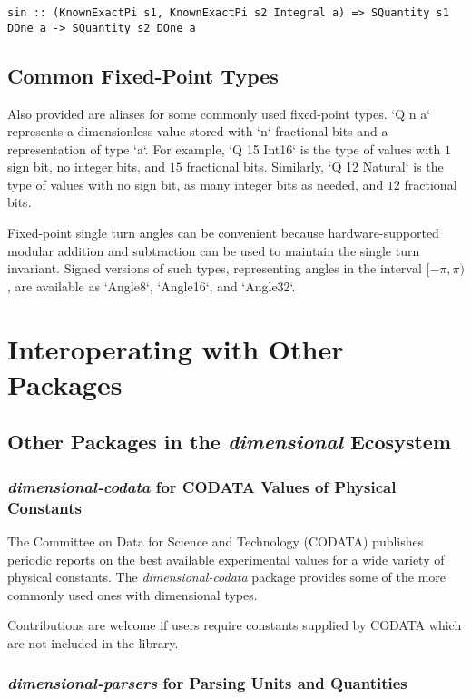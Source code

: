 \documentclass[11pt]{report}
\newcommand{\packagename}[1]{\textit{#1}}
\newcommand{\thispackage}{\packagename{dimensional}}
\begin{document}
\begin{lstlisting}
sin :: (KnownExactPi s1, KnownExactPi s2 Integral a) => SQuantity s1 DOne a -> SQuantity s2 DOne a
\end{lstlisting}

\section{Common Fixed-Point Types}

Also provided are aliases for some commonly used fixed-point types. `Q n a` represents a dimensionless value stored with `n` fractional bits
and a representation of type `a`. For example, `Q 15 Int16` is the type of values with $ 1 $ sign bit, no integer bits, and $ 15 $ fractional bits.
Similarly, `Q 12 Natural` is the type of values with no sign bit, as many integer bits as needed, and $ 12 $ fractional bits.

Fixed-point single turn angles can be convenient because hardware-supported modular addition and subtraction can be used to maintain the
single turn invariant. Signed versions of such types, representing angles in the interval $ [-\pi, \pi) $, are available as `Angle8`, `Angle16`,
and `Angle32`.




\chapter{Interoperating with Other Packages}

\section{Other Packages in the \thispackage{} Ecosystem}

\subsection{\packagename{dimensional-codata} for CODATA Values of Physical Constants}

The Committee on Data for Science and Technology (CODATA) publishes periodic reports on the best available
experimental values for a wide variety of physical constants. The \packagename{dimensional-codata} package
provides some of the more commonly used ones with dimensional types.

Contributions are welcome if users require constants supplied by CODATA which are not included in the library.

\subsection{\packagename{dimensional-parsers} for Parsing Units and Quantities}
\end{document}
